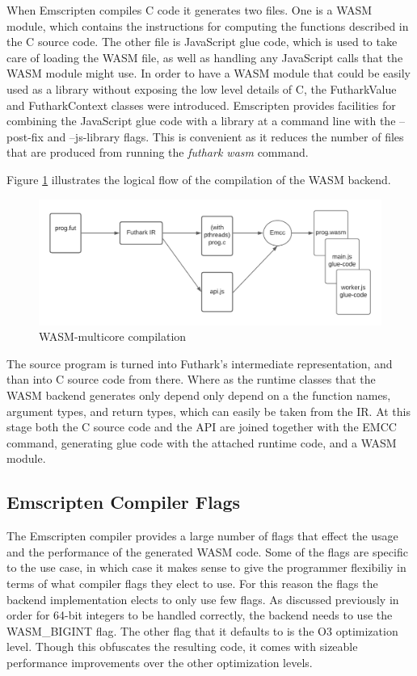 \documentclass[11pt]{book}
\begin{document}
When Emscripten compiles C code it generates two files. One is a WASM module, which contains the instructions for computing the functions described in the C source code. The other file is JavaScript glue code, which is used to take care of loading the WASM file, as well as handling any JavaScript calls that the WASM module might use. In order to have a WASM module that could be easily used as a library without exposing the low level details of C, the FutharkValue and FutharkContext classes were introduced. Emscripten provides facilities for combining the JavaScript glue code with a library at a command line with the --post-fix and --js-library flags. This is convenient as it reduces the number of files that are produced from running the \textit{futhark wasm} command.



Figure \ref{fig:wasm} illustrates the logical flow of the compilation of the WASM backend. 

\begin{figure}[htbp]
\centerline{\includegraphics[width=\textwidth]{figures/WASM_MC_compiler.png}}
\caption{WASM-multicore compilation}
\label{fig:wasm}
\end{figure}

The source program is turned into Futhark's intermediate representation, and than into C source code from there. Where as the runtime classes that the WASM backend generates only depend only depend on a the function names, argument types, and return types, which can easily be taken from the IR. At this stage both the C source code and the API are joined together with the EMCC command, generating glue code with the attached runtime code, and a WASM module. 

\subsection{Emscripten Compiler Flags}
The Emscripten compiler provides a large number of flags that effect the usage and the performance of the generated WASM code. Some of the flags are specific to the use case, in which case it makes sense to give the programmer flexibiliy in terms of what compiler flags they elect to use. For this reason the flags the backend implementation elects to only use few flags. As discussed previously in order for 64-bit integers to be handled correctly, the backend needs to use the WASM\_BIGINT flag. The other flag that it defaults to is the O3 optimization level. Though this obfuscates the resulting code, it comes with sizeable performance improvements over the other optimization levels.
\end{document}
